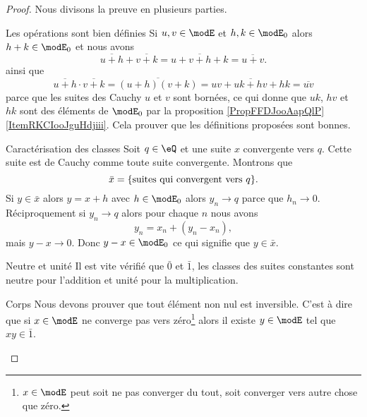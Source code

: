 \begin{proof}
    Nous divisons la preuve en plusieurs parties.
    \begin{subproof}
    \item[Les opérations sont bien définies]
    Si \( u,v\in \modE\) et \( h,k\in \modE_0\) alors \( h+k\in\modE_0\) et nous avons 
    \begin{equation}
        \overline{ u+h }+\overline{ v+k }=\overline{ u+v+h+k }=\overline{ u+v }.
    \end{equation}
    ainsi que
    \begin{equation}
        \overline{ u+h }\cdot \overline{ v+k }=\overline{ (u+h)(v+k) }=\overline{ uv+uk+hv+hk }=\overline{ uv }
    \end{equation}
    parce que les suites des Cauchy \( u\) et \( v\) sont bornées, ce qui donne que \( uk\), \( hv\) et \( hk\) sont des éléments de \( \modE_0\) par la proposition \ref{PropFFDJooAapQlP}\ref{ItemRKCIooJguHdjiii}. Cela prouver que les définitions proposées sont bonnes.

    \item[Caractérisation des classes]
        Soit \( q\in \eQ\) et une suite \( x\) convergente vers \( q\). Cette suite est de Cauchy comme toute suite convergente. Montrons que
        \begin{equation}
            \bar x=\{ \text{suites qui convergent vers \( q\)} \}.
        \end{equation}
        Si \( y\in\bar x\) alors \( y=x+h\) avec \( h\in \modE_0\) alors \( y_n\to q\) parce que \( h_n\to 0\). Réciproquement si \( y_n\to q\) alors pour chaque \( n\) nous avons
        \begin{equation}
            y_n=x_n+(y_n-x_n),
        \end{equation}
        mais \( y-x\to 0\). Donc \( y-x\in\modE_0\) ce qui signifie que \( y\in\bar x\).
    \item[Neutre et unité]
        Il est vite vérifié que \( \bar 0\) et \( \bar 1\), les classes des suites constantes sont neutre pour l'addition et unité pour la multiplication.
    \item[Corps]
        Nous devons prouver que tout élément non nul est inversible. C'est à dire que si \( x\in\modE\) ne converge pas vers zéro\footnote{\( x\in\modE\) peut soit ne pas converger du tout, soit converger vers autre chose que zéro.} alors il existe \( y\in \modE\) tel que \( xy\in\bar 1\). 


\end{subproof}
\end{proof}
